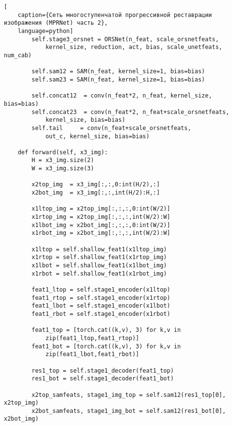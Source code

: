 \begin{lstlisting}[
    caption={Сеть многоступенчатой прогрессивной реставрации изображения (MPRNet) часть 2},
    language=python]
        self.stage3_orsnet = ORSNet(n_feat, scale_orsnetfeats, 
            kernel_size, reduction, act, bias, scale_unetfeats, num_cab)

        self.sam12 = SAM(n_feat, kernel_size=1, bias=bias)
        self.sam23 = SAM(n_feat, kernel_size=1, bias=bias)
        
        self.concat12  = conv(n_feat*2, n_feat, kernel_size, bias=bias)
        self.concat23  = conv(n_feat*2, n_feat+scale_orsnetfeats, 
            kernel_size, bias=bias)
        self.tail     = conv(n_feat+scale_orsnetfeats, 
            out_c, kernel_size, bias=bias)

    def forward(self, x3_img):
        H = x3_img.size(2)
        W = x3_img.size(3)

        x2top_img  = x3_img[:,:,0:int(H/2),:]
        x2bot_img  = x3_img[:,:,int(H/2):H,:]

        x1ltop_img = x2top_img[:,:,:,0:int(W/2)]
        x1rtop_img = x2top_img[:,:,:,int(W/2):W]
        x1lbot_img = x2bot_img[:,:,:,0:int(W/2)]
        x1rbot_img = x2bot_img[:,:,:,int(W/2):W]

        x1ltop = self.shallow_feat1(x1ltop_img)
        x1rtop = self.shallow_feat1(x1rtop_img)
        x1lbot = self.shallow_feat1(x1lbot_img)
        x1rbot = self.shallow_feat1(x1rbot_img)
        
        feat1_ltop = self.stage1_encoder(x1ltop)
        feat1_rtop = self.stage1_encoder(x1rtop)
        feat1_lbot = self.stage1_encoder(x1lbot)
        feat1_rbot = self.stage1_encoder(x1rbot)
        
        feat1_top = [torch.cat((k,v), 3) for k,v in 
            zip(feat1_ltop,feat1_rtop)]
        feat1_bot = [torch.cat((k,v), 3) for k,v in 
            zip(feat1_lbot,feat1_rbot)]
        
        res1_top = self.stage1_decoder(feat1_top)
        res1_bot = self.stage1_decoder(feat1_bot)

        x2top_samfeats, stage1_img_top = self.sam12(res1_top[0], x2top_img)
        x2bot_samfeats, stage1_img_bot = self.sam12(res1_bot[0], x2bot_img)
\end{lstlisting}


